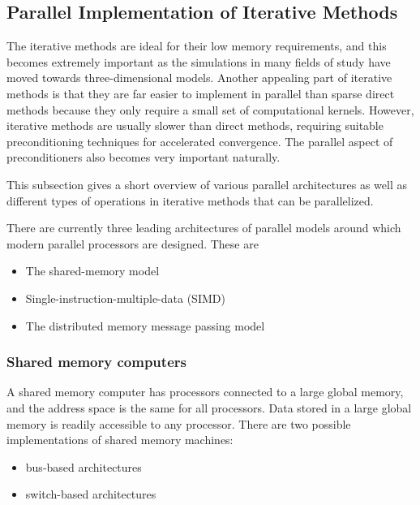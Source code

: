 \subsection{Parallel Implementation of Iterative Methods}
\label{section:parallel}
The iterative methods are ideal for their low memory requirements, and this becomes extremely important as the simulations in many fields of study have moved towards three-dimensional models. Another appealing part of iterative methods is that they are far easier to implement in parallel than sparse direct methods because they only require a small set of computational kernels. However, iterative methods are usually slower than direct methods, requiring suitable preconditioning techniques for accelerated convergence. The parallel aspect of preconditioners also becomes very important naturally.

This subsection gives a short overview of various parallel architectures as well as different types of operations in iterative methods that can be parallelized.

There are currently three leading architectures of parallel models around which modern parallel processors are designed. These are
\begin{itemize}
    \item The shared-memory model
    \item Single-instruction-multiple-data (SIMD)
    \item The distributed memory message passing model
\end{itemize}

\subsubsection{Shared memory computers}
A shared memory computer has processors connected to a large global memory, and the address space is the same for all processors. Data stored in a large global memory is readily accessible to any processor. There are two possible implementations of shared memory machines: 
\begin{itemize}
    \item bus-based architectures
    \item switch-based architectures
\end{itemize}

